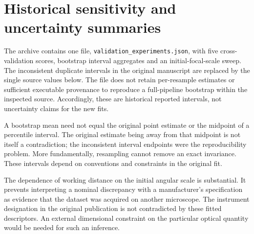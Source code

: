 \documentclass[10pt,a4paper]{article}
\begin{document}
\section{Historical sensitivity and uncertainty summaries}
The archive contains one file, \texttt{validation\_experiments.json}, with five cross-validation scores, bootstrap interval aggregates and an initial-focal-scale sweep. The inconsistent duplicate intervals in the original manuscript are replaced by the single source values below. The file does not retain per-resample estimates or sufficient executable provenance to reproduce a full-pipeline bootstrap within the inspected source. Accordingly, these are historical reported intervals, not uncertainty claims for the new fits.

\begin{table}[htbp]\centering
\caption{Archived interval endpoints, transcribed from one JSON source. They do not establish independent physical accuracy.}

\end{table}

A bootstrap mean need not equal the original point estimate or the midpoint of a percentile interval. The original estimate being away from that midpoint is not itself a contradiction; the inconsistent interval endpoints were the reproducibility problem. More fundamentally, resampling cannot remove an exact invariance. These intervals depend on conventions and constraints in the original fit.

\begin{table}[htbp]\centering
\caption{Archived sensitivity to initial $f_x$. RMS is the historical score with its original pixel-equivalent convention. These are not reruns of the revised comparison.}

\end{table}

The dependence of working distance on the initial angular scale is substantial. It prevents interpreting a nominal discrepancy with a manufacturer's specification as evidence that the dataset was acquired on another microscope. The instrument designation in the original publication is not contradicted by these fitted descriptors. An external dimensional constraint on the particular optical quantity would be needed for such an inference.
\end{document}

